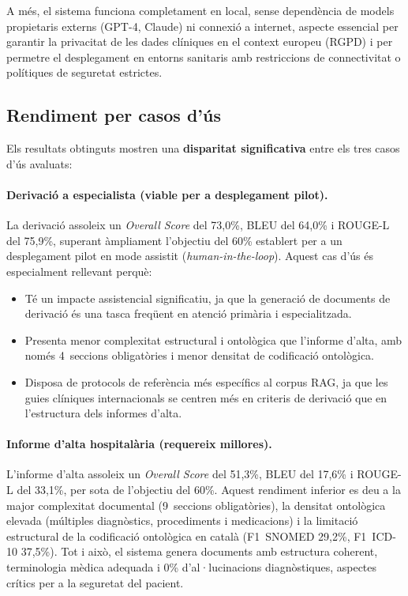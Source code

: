 \documentclass[CAT]{TFUOC}%
\begin{document}
A més, el sistema funciona completament en local, sense dependència de models propietaris externs (GPT-4, Claude) ni connexió a internet, aspecte essencial per garantir la privacitat de les dades clíniques en el context europeu (RGPD) i per permetre el desplegament en entorns sanitaris amb restriccions de connectivitat o polítiques de seguretat estrictes.

\subsection{Rendiment per casos d'ús}

Els resultats obtinguts mostren una \textbf{disparitat significativa} entre els tres casos d'ús avaluats:

\paragraph{Derivació a especialista (viable per a desplegament pilot).}
La derivació assoleix un \textit{Overall Score} del 73,0\%, BLEU del 64,0\% i ROUGE-L del 75,9\%, superant àmpliament l'objectiu del 60\% establert per a un desplegament pilot en mode assistit (\textit{human-in-the-loop}). Aquest cas d'ús és especialment rellevant perquè:

\begin{itemize}
    \item Té un impacte assistencial significatiu, ja que la generació de documents de derivació és una tasca freqüent en atenció primària i especialitzada.
    \item Presenta menor complexitat estructural i ontològica que l'informe d'alta, amb només 4~seccions obligatòries i menor densitat de codificació ontològica.
    \item Disposa de protocols de referència més específics al corpus RAG, ja que les guies clíniques internacionals se centren més en criteris de derivació que en l'estructura dels informes d'alta.
\end{itemize}

\paragraph{Informe d'alta hospitalària (requereix millores).}
L'informe d'alta assoleix un \textit{Overall Score} del 51,3\%, BLEU del 17,6\% i ROUGE-L del 33,1\%, per sota de l'objectiu del 60\%. Aquest rendiment inferior es deu a la major complexitat documental (9~seccions obligatòries), la densitat ontològica elevada (múltiples diagnòstics, procediments i medicacions) i la limitació estructural de la codificació ontològica en català (F1~SNOMED 29,2\%, F1~ICD-10 37,5\%). Tot i això, el sistema genera documents amb estructura coherent, terminologia mèdica adequada i 0\% d'al·lucinacions diagnòstiques, aspectes crítics per a la seguretat del pacient.
\end{document}
